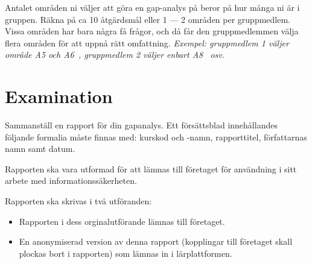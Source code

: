 \documentclass[a4paper]{article}
\begin{document}
Antalet områden ni väljer att göra en gap-analys på beror på hur många ni är i gruppen. Räkna på ca
10 åtgärdsmål eller 1 --- 2 områden per gruppmedlem. Vissa områden har bara några få frågor, och då
får den gruppmedlemmen välja flera områden för att uppnå rätt omfattning. \emph{Exempel: gruppmedlem 1
väljer område A5 och A6~\cite[Bilaga A]{iso27001}, gruppmedlem 2 väljer enbart A8~\cite[Bilaga
A]{iso27001} osv.}

\section{Examination}

Sammanställ en rapport för din gapanalys.
Ett försättsblad innehållandes följande formalia måste finnas med:
kurskod och -namn, rapporttitel, författarnas namn samt datum.

Rapporten ska vara utformad för att lämnas till företaget för användning i sitt
arbete med informationssäkerheten.

Rapporten ska skrivas i två utföranden:
\begin{itemize}
  \item Rapporten i dess orginalutförande lämnas till företaget.
  \item En anonymiserad version av denna rapport (kopplingar till företaget
    skall plockas bort i rapporten) som lämnas in i lärplattformen.
\end{itemize}




\printbibliography{}
\end{document}
